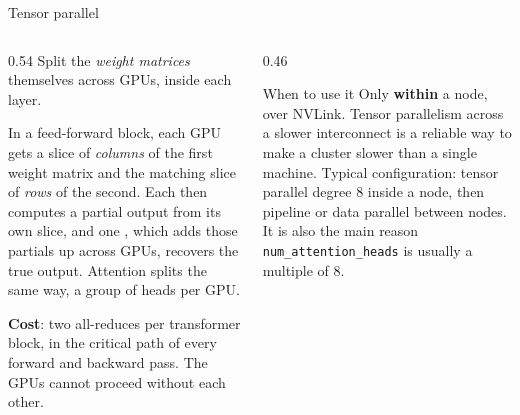 \documentclass[aspectratio=169,10pt]{beamer}
\begin{document}
\iffalse
\begin{frame}{Tensor parallel}
  \begin{columns}[T]
    \begin{column}{0.54\textwidth}
      Split the \emph{weight matrices} themselves across GPUs, inside each
      layer.
      \vspace{0.4em}

      In a feed-forward block, each GPU gets a slice of \emph{columns} of the
      first weight matrix and the matching slice of \emph{rows} of the second.
      Each then computes a partial output from its own slice, and one
      , which adds those partials up across GPUs, recovers the
      true output. Attention splits the same way, a group of heads per GPU.
      \vspace{0.5em}

      \textbf{Cost}: two all-reduces per transformer block, in the critical path
      of every forward and backward pass. The GPUs cannot proceed without each
      other.
    \end{column}
    \begin{column}{0.46\textwidth}
      \begin{block}{When to use it}
        \small
        Only \textbf{within} a node, over NVLink. Tensor parallelism across a
        slower interconnect is a reliable way to make a cluster slower than a
        single machine.
        \vspace{0.4em}
        Typical configuration: tensor parallel degree 8 inside a node, then
        pipeline or data parallel between nodes.
        \vspace{0.4em}
        It is also the main reason \texttt{num\_attention\_heads} is usually a
        multiple of 8.
      \end{block}
    \end{column}
  \end{columns}
\end{frame}
\end{document}
